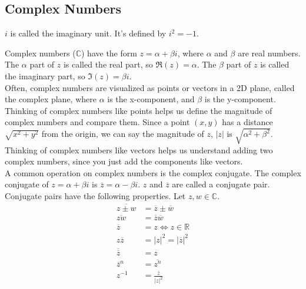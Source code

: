 \subsection{Complex Numbers}
\begin{definition}
	$i$ is called the imaginary unit. It's defined by $i^2 = -1$.
\end{definition}


\noindent
Complex numbers ($\mathbb{C}$) have the form $z = \alpha + \beta i$, where $\alpha$ and $\beta$ are real numbers. The $\alpha$ part of $z$ is called the real part, so $\Re(z) = \alpha$. The $\beta$ part of $z$ is called the imaginary part, so $\Im(z) = \beta i$.\\

\noindent
Often, complex numbers are visualized as points or vectors in a 2D plane, called the complex plane, where $\alpha$ is the x-component, and $\beta$ is the y-component. Thinking of complex numbers like points helps us define the magnitude of complex numbers and compare them. Since a point $(x,y)$ has a distance $\sqrt{x^2+y^2}$ from the origin, we can say the magnitude of $z$, $\lvert z \rvert$ is $\sqrt{\alpha^2 + \beta^2}$. Thinking of complex numbers like vectors helps us understand adding two complex numbers, since you just add the components like vectors.\\

\noindent
A common operation on complex numbers is the complex conjugate. The complex conjugate of $z = \alpha + \beta i$ is $\overline{z} = \alpha - \beta i$. $z$ and $\overline{z}$ are called a conjugate pair.\\

\noindent
Conjugate pairs have the following properties.
Let $z, w \in \mathbb{C}$.
\begin{align*}
	\overline{z \pm w} &= \overline{z} \pm \overline{w} \\
	\overline{zw} &= \overline{z}\overline{w} \\
	\overline{z} &= z \Leftrightarrow z \in \mathbb{R} \\
	z\overline{z} &= \lvert z \rvert^2 = \lvert \overline{z} \rvert^2 \\
	\overline{\overline{z}} &= z \\
	\overline{z}^n &= \overline{z^n} \\
	z^{-1} &= \frac{\overline{z}}{\lvert z \rvert^2} 
\end{align*}
